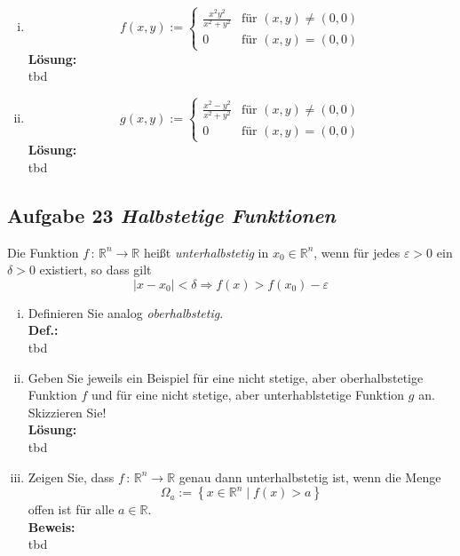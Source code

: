 \documentclass[11pt,a4paper,ngerman]{article}
\begin{document}
\begin{enumerate}[(i)]
	\item
		$$
			f(x,y) := \left\{ 
			\begin{array}{lr}
				\frac{x^2y^2}{x^2+y^2} & \text{für }(x,y)\not= (0,0)\\
				0& \text{für }(x,y) = (0,0)
			\end{array}\right.
		$$
	\textbf{Lösung:}\\
		tbd

	\item
		$$
			g(x,y) := \left\{
				\begin{array}{lr}
					\frac{x^2 - y^2}{x^2 + y^2} & \text{für }(x,y) \not= (0,0) \\
					0 & \text{für } (x,y) = (0,0)
				\end{array}
			\right.
		$$
	\textbf{Lösung:}\\
		tbd
\end{enumerate}

\subsection*{Aufgabe 23 \mdseries\itshape Halbstetige Funktionen}

Die Funktion $f \, : \, \mathbb{R}^n \rightarrow \mathbb{R}$ heißt \emph{unterhalbstetig} in $x_0 \in \mathbb{R}^n$, wenn für jedes $\varepsilon > 0$ ein $\delta > 0$ existiert, so dass gilt
	$$
		| x - x_0 | < \delta \Rightarrow f(x) > f(x_0) - \varepsilon
	$$

\begin{enumerate}[(i)]
	\item Definieren Sie analog \emph{oberhalbstetig}.\\
	\textbf{Def.:}\\
		tbd

	\item Geben Sie jeweils ein Beispiel für eine nicht stetige, aber oberhalbstetige Funktion $f$ und für eine nicht stetige, aber unterhablstetige 
		Funktion $g$ an. Skizzieren Sie!\\
	\textbf{Lösung:}\\
		tbd

	\item Zeigen Sie, dass $f \, : \, \mathbb{R}^n \rightarrow \mathbb{R}$ genau dann unterhalbstetig ist, wenn die Menge
	$$
		\Omega_a := \left\{ x \in \mathbb{R}^n \; | \; f(x) > a \right\}
	$$
	offen ist für alle $a \in \mathbb{R}$.\\
	\textbf{Beweis:}\\
		tbd
\end{enumerate}
\label{LastPage}
\end{document}
